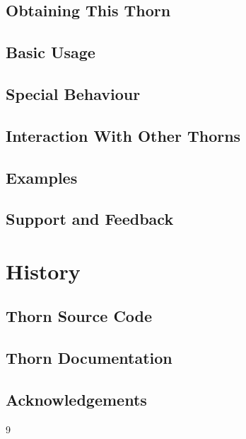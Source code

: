 \subsection{Obtaining This Thorn}

\subsection{Basic Usage}

\subsection{Special Behaviour}

\subsection{Interaction With Other Thorns}

\subsection{Examples}

\subsection{Support and Feedback}

\section{History}

\subsection{Thorn Source Code}

\subsection{Thorn Documentation}

\subsection{Acknowledgements}


\begin{thebibliography}{9}

\end{thebibliography}




